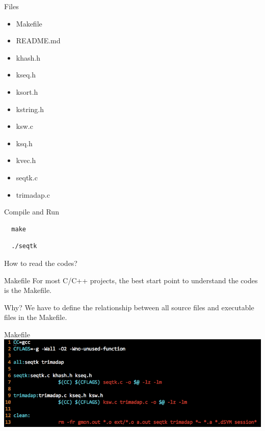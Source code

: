 \documentclass[UTF8]{beamer}
\begin{document}
\begin{frame}[t]{Files}
\begin{itemize}
  \item Makefile
  \item README.md
  \item khash.h
  \item kseq.h
  \item ksort.h
  \item kstring.h
  \item ksw.c
  \item ksq.h
  \item kvec.h
  \item seqtk.c
  \item trimadap.c
\end{itemize}
\end{frame}

\begin{frame}[t, fragile]{Compile and Run}
\begin{verbatim}
  make
\end{verbatim}

\begin{verbatim}
  ./seqtk
\end{verbatim}
\end{frame}

\begin{frame}[t]{How to read the codes?}
\begin{block}{Makefile}
  For most C/C++ projects, the best start point to understand the codes is the
  Makefile.
\end{block}

\begin{block}{Why?}
  We have to define the relationship between all source files and executable
  files in the Makefile.
\end{block}

\end{frame}

\begin{frame}[t]{Makefile}
\includegraphics[width=\textwidth]{seqtkmakefile.png}
\end{frame}
\end{document}
